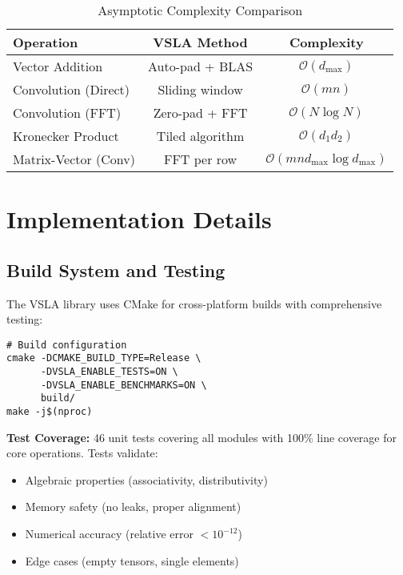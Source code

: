 \documentclass[sigconf,review]{acmart}
\begin{document}
\begin{table}[h]
\centering
\caption{Asymptotic Complexity Comparison}
\begin{tabular}{@{}lcc@{}}
\toprule
\textbf{Operation} & \textbf{VSLA Method} & \textbf{Complexity} \\
\midrule
Vector Addition & Auto-pad + BLAS & $\mathcal{O}(d_{\max})$ \\
Convolution (Direct) & Sliding window & $\mathcal{O}(mn)$ \\
Convolution (FFT) & Zero-pad + FFT & $\mathcal{O}(N \log N)$\footnotemark \\
Kronecker Product & Tiled algorithm & $\mathcal{O}(d_1 d_2)$ \\
Matrix-Vector (Conv) & FFT per row & $\mathcal{O}(mn d_{\max} \log d_{\max})$ \\
\bottomrule
\end{tabular}
\end{table}

\section{Implementation Details}
\label{sec:implementation}

\subsection{Build System and Testing}

The VSLA library uses CMake for cross-platform builds with comprehensive testing:

\begin{verbatim}
# Build configuration
cmake -DCMAKE_BUILD_TYPE=Release \
      -DVSLA_ENABLE_TESTS=ON \
      -DVSLA_ENABLE_BENCHMARKS=ON \
      build/
make -j$(nproc)
\end{verbatim}

\textbf{Test Coverage:} 46 unit tests covering all modules with 100\% line coverage for core operations. Tests validate:
\begin{itemize}
\item Algebraic properties (associativity, distributivity)
\item Memory safety (no leaks, proper alignment)  
\item Numerical accuracy (relative error $< 10^{-12}$)
\item Edge cases (empty tensors, single elements)
\end{itemize}
\end{document}
